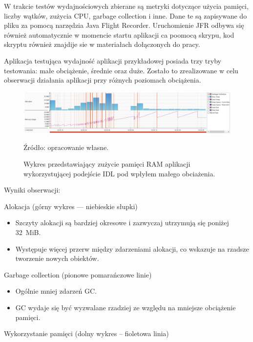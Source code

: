 \documentclass[runningheads,12pt]{llncs}
\begin{document}
W trakcie testów wydajnościowych zbierane są metryki dotyczące użycia pamięci, liczby wątków, zużycia CPU, garbage collection i inne. Dane te są zapisywane do pliku za pomocą narzędzia Java Flight Recorder. Uruchomienie JFR odbywa się również automatycznie w momencie startu aplikacji ca poomocą skrypu, kod skryptu również znajdije sie w materiałach dołączonych do pracy. 

Aplikacja testująca wydajność aplikacji przykładowej posiada trzy tryby testowania: małe obciążenie, średnie oraz duże. Zostało to zrealizowane w celu obserwacji działania aplikacji przy różnych poziomach obciążenia.

\newpage

\begin{figure}
    \includegraphics[width=\linewidth]{images/idl-memory-low-graph.jpg}
    \caption{Wykres przedstawiający zużycie pamięci RAM aplikacji wykorzystującej podejście IDL pod wpłyłem małego obciażenia.} \label{fig1}
    \vspace{0.5em}
    {\small Źródło: opracowanie własne.}
\end{figure}

Wyniki obserwacji:

Alokacja (górny wykres — niebieskie słupki)

\begin{itemize}
    \item Szczyty alokacji są bardziej okresowe i zazwyczaj utrzymują się poniżej 32~MiB.
    \item Występuje więcej przerw między zdarzeniami alokacji, co wskazuje na rzadsze tworzenie nowych obiektów.
\end{itemize}

Garbage collection (pionowe pomarańczowe linie)

\begin{itemize}
    \item Ogólnie mniej zdarzeń GC.
    \item GC wydaje się być wyzwalane rzadziej ze względu na mniejsze obciążenie pamięci.
\end{itemize}

Wykorzystanie pamięci (dolny wykres – fioletowa linia)
\end{document}
